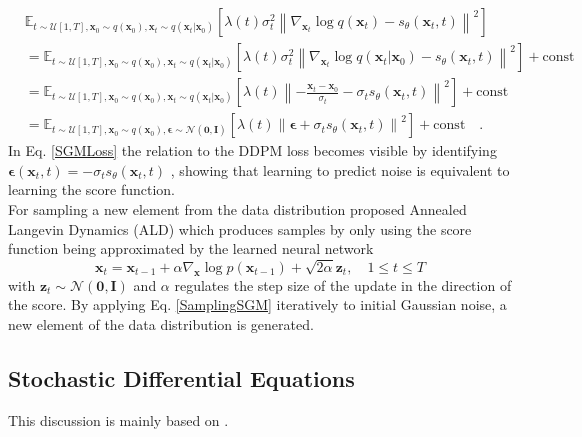 \begin{align}
   &\mathbb{E}_{t \sim \mathcal{U}[1,T], \mathbf{x}_0 \sim q(\mathbf{x}_0), \mathbf{x}_t \sim q(\mathbf{x}_t|\mathbf{x}_0)} \left[ \lambda(t) \sigma_t^2 \left\| \nabla_{\mathbf{x}_t} \log q(\mathbf{x}_t) - s_\theta(\mathbf{x}_t, t) \right\|^2 \right] 
   \label{SGMObjectiveFunction}\\
 &= \mathbb{E}_{t \sim \mathcal{U}[1,T], \mathbf{x}_0 \sim q(\mathbf{x}_0), \mathbf{x}_t \sim q(\mathbf{x}_t|\mathbf{x}_0)} \left[ \lambda(t) \sigma_t^2 \left\| \nabla_{\mathbf{x}_t} \log q(\mathbf{x}_t | \mathbf{x}_0) - s_\theta(\mathbf{x}_t, t) \right\|^2 \right] + \text{const} \\
 &= \mathbb{E}_{t \sim \mathcal{U}[1,T], \mathbf{x}_0 \sim q(\mathbf{x}_0), \mathbf{x}_t \sim q(\mathbf{x}_t|\mathbf{x}_0)} \left[ \lambda(t) \left\| -\frac{\mathbf{x}_t - \mathbf{x}_0}{\sigma_t} - \sigma_t s_\theta(\mathbf{x}_t, t) \right\|^2 \right] + \text{const} \\
 &= \mathbb{E}_{t \sim \mathcal{U}[1,T], \mathbf{x}_0 \sim q(\mathbf{x}_0), \boldsymbol{\epsilon} \sim \mathcal{N}(\mathbf{0}, \mathbf{I})} \left[ \lambda(t) \left\| \boldsymbol{\epsilon} + \sigma_t s_\theta(\mathbf{x}_t, t) \right\|^2 \right] + \text{const}
 \label{SGMLoss} \quad.
\end{align}
In Eq. \ref{SGMLoss} the relation to the \gls{DDPM} loss becomes visible by identifying $\boldsymbol{\epsilon}(\mathbf{x}_t,t) = - \sigma_t s_\theta(\mathbf{x}_t,t)$ \cite{Survey2}, showing that learning to predict noise is equivalent to learning the score function. \\
For sampling a new element from the data distribution \cite{SGM} proposed Annealed Langevin Dynamics (\gls{ALD}) which produces samples by only using the score function being approximated by the learned neural network
\begin{equation}
    \mathbf{x}_t = \mathbf{x}_{t-1} + \alpha \nabla_{\mathbf{x}} \log p(\mathbf{x}_{t-1}) + \sqrt{2\alpha} \mathbf{z}_t, \quad 1 \leq t \leq T
    \label{SamplingSGM}
\end{equation}
with $\mathbf{z}_t \sim \mathcal{N}(\mathbf{0}, \mathbf{I})$ and $\alpha$ regulates the step size of the update in the direction of the score. By applying Eq. \ref{SamplingSGM} iteratively to initial Gaussian noise, a new element of the data distribution is generated.


\subsection{Stochastic Differential Equations}
This discussion is mainly based on \cite{Survey2, SurveyDM}.


